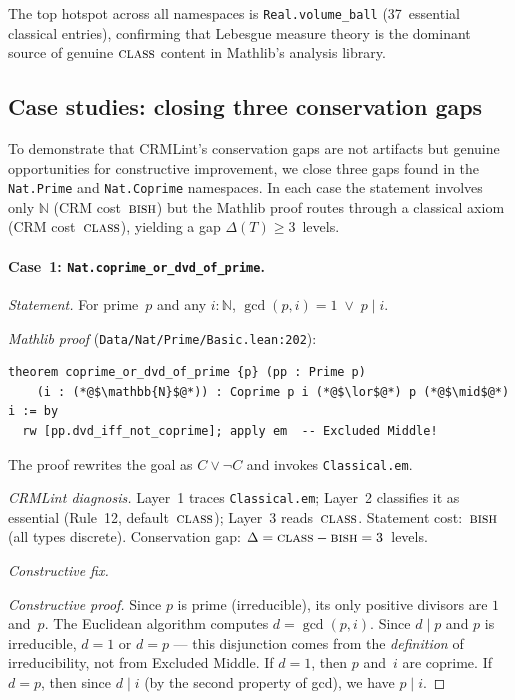 \documentclass[12pt, a4paper]{article}
\theoremstyle{plain}
\theoremstyle{definition}
\theoremstyle{remark}
\newcommand{\BISH}{\textsc{bish}}
\newcommand{\CLASS}{\textsc{class}}
\begin{document}
The top hotspot across all namespaces is
\texttt{Real.volume\_ball} (37~essential classical entries),
confirming that Lebesgue measure theory is the dominant source
of genuine $\CLASS$ content in Mathlib's analysis library.


\subsection{Case studies: closing three conservation gaps}\label{sec:case-studies}

To demonstrate that CRMLint's conservation gaps are not artifacts but
genuine opportunities for constructive improvement, we close three
gaps found in the \texttt{Nat.Prime} and \texttt{Nat.Coprime}
namespaces.  In each case the statement involves only $\mathbb{N}$
(CRM cost~$\BISH$) but the Mathlib proof routes through a classical
axiom (CRM cost~$\CLASS$), yielding a gap $\Delta(T) \geq 3$~levels.

\paragraph{Case~1: \texttt{Nat.coprime\_or\_dvd\_of\_prime}.}
\emph{Statement.}  For prime~$p$ and any $i : \mathbb{N}$,
$\gcd(p, i) = 1 \;\lor\; p \mid i$.

\emph{Mathlib proof} (\texttt{Data/Nat/Prime/Basic.lean:202}):

\begin{lstlisting}
theorem coprime_or_dvd_of_prime {p} (pp : Prime p)
    (i : (*@$\mathbb{N}$@*)) : Coprime p i (*@$\lor$@*) p (*@$\mid$@*) i := by
  rw [pp.dvd_iff_not_coprime]; apply em  -- Excluded Middle!
\end{lstlisting}

The proof rewrites the goal as $C \lor \lnot C$ and invokes
\texttt{Classical.em}.

\emph{CRMLint diagnosis.}  Layer~1 traces \texttt{Classical.em};
Layer~2 classifies it as essential (Rule~12, default~$\CLASS$);
Layer~3 reads~$\CLASS$.  Statement cost:~$\BISH$ (all types discrete).
Conservation gap: $\Delta = \CLASS - \BISH = 3$~levels.

\emph{Constructive fix.}

\begin{proof}[Constructive proof]
Since $p$ is prime (irreducible), its only positive divisors are $1$
and~$p$.  The Euclidean algorithm computes $d = \gcd(p,i)$.  Since
$d \mid p$ and $p$ is irreducible, $d = 1$ or $d = p$ --- this
disjunction comes from the \emph{definition} of irreducibility, not
from Excluded Middle.  If $d = 1$, then $p$ and~$i$ are coprime.
If $d = p$, then since $d \mid i$ (by the second property of gcd),
we have $p \mid i$.
\end{proof}
\end{document}
